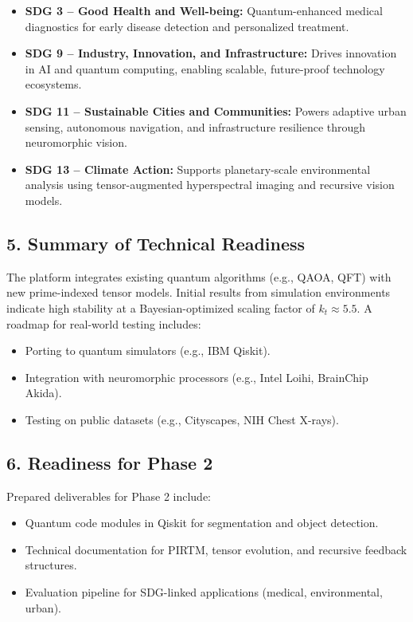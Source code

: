 \documentclass{article}
\theoremstyle{plain}
\begin{document}
\begin{itemize}
    \item \textbf{SDG 3 – Good Health and Well-being:} Quantum-enhanced medical diagnostics for early disease detection and personalized treatment.
    \item \textbf{SDG 9 – Industry, Innovation, and Infrastructure:} Drives innovation in AI and quantum computing, enabling scalable, future-proof technology ecosystems.
    \item \textbf{SDG 11 – Sustainable Cities and Communities:} Powers adaptive urban sensing, autonomous navigation, and infrastructure resilience through neuromorphic vision.
    \item \textbf{SDG 13 – Climate Action:} Supports planetary-scale environmental analysis using tensor-augmented hyperspectral imaging and recursive vision models.
\end{itemize}

\subsection*{5. Summary of Technical Readiness}
The platform integrates existing quantum algorithms (e.g., QAOA, QFT) with new prime-indexed tensor models. Initial results from simulation environments indicate high stability at a Bayesian-optimized scaling factor of \( k_t \approx 5.5 \). A roadmap for real-world testing includes:
\begin{itemize}
    \item Porting to quantum simulators (e.g., IBM Qiskit).
    \item Integration with neuromorphic processors (e.g., Intel Loihi, BrainChip Akida).
    \item Testing on public datasets (e.g., Cityscapes, NIH Chest X-rays).
\end{itemize}

\subsection*{6. Readiness for Phase 2}
Prepared deliverables for Phase 2 include:
\begin{itemize}
    \item Quantum code modules in Qiskit for segmentation and object detection.
    \item Technical documentation for PIRTM, tensor evolution, and recursive feedback structures.
    \item Evaluation pipeline for SDG-linked applications (medical, environmental, urban).
\end{itemize}
\end{document}
